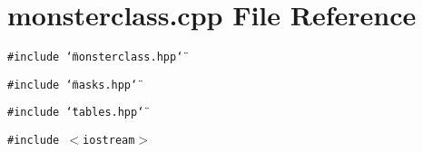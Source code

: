 \section{monsterclass.cpp File Reference}
\label{monsterclass_8cpp}
{\tt \#include \char`\"{}monsterclass.hpp\char`\"{}}\par
{\tt \#include \char`\"{}masks.hpp\char`\"{}}\par
{\tt \#include \char`\"{}tables.hpp\char`\"{}}\par
{\tt \#include $<$iostream$>$}\par
